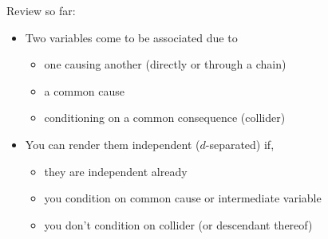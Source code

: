 \documentclass[xcolor=dvipsnames]{beamer}
\begin{document}
\begin{frame}{Review so far: }

\begin{itemize}
\small
\item<2-> Two variables come to be associated due to
\begin{itemize}
\item one causing another (directly or through a chain)
\item a common cause
\item conditioning on a common consequence (collider) 
\end{itemize}
\smallskip
\item<3-> You can render them independent ($d$-separated) if,
\begin{itemize}
\item they are independent already
\item you condition on common cause or intermediate variable
\item you don't condition on collider (or descendant thereof)
\end{itemize}
\end{itemize}
\end{frame}
\end{document}
